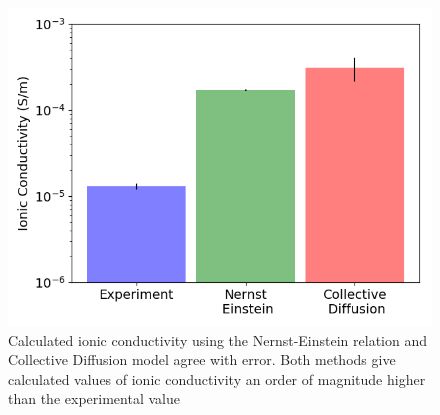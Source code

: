 \documentclass{article}
\begin{document}

\begin{figure}
	\centering
	\includegraphics[width=0.5\linewidth]{IC_offset.png}
	\caption{Calculated ionic conductivity using the Nernst-Einstein relation
	and Collective Diffusion model agree with error. Both methods give calculated
	values of ionic conductivity an order of magnitude higher than the experimental
	value}
	\label{fig:conductivity}
\end{figure}	
\end{document}
